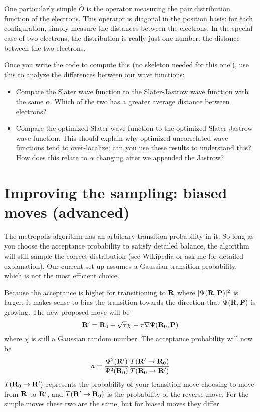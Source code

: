 \documentclass[12pt]{article}
\newcommand{\bR}{{\bf R}}
\newcommand{\bP}{{\bf P}}
\begin{document}
One particularly simple $\hat O$ is the operator measuring the pair distribution function of the electrons. 
This operator is diagonal in the position basis: for each configuration, simply measure the distances between the electrons.
In the special case of two electrons, the distribution is really just one number: the distance between the two electrons.

Once you write the code to compute this (no skeleton needed for this one!), use this to analyze the differences between our wave functions:
\begin{itemize}
  \item
    Compare the Slater wave function to the Slater-Jastrow wave function with the same $\alpha$. 
    Which of the two has a greater average distance between electrons?
  \item
    Compare the optimized Slater wave function to the optimized Slater-Jastrow wave function. 
    This should explain why optimized uncorrelated wave functions tend to over-localize; can you use these results to understand this? How does this relate to $\alpha$ changing after we appended the Jastrow?
\end{itemize}

\section{Improving the sampling: biased moves (advanced)} 

The metropolis algorithm has an arbitrary transition probability in it. 
So long as you choose the acceptance probability to satisfy detailed balance, the algorithm will still sample the correct distribution (see Wikipedia or ask me for detailed explanation).
Our current set-up assumes a Gaussian transition probability, which is not the most efficient choice.

Because the acceptance is higher for transitioning to $\bR$ where $|\Psi(\bR,\bP)|^2$ is larger, it makes sense to bias the transition towards the direction that $\Psi(\bR,\bP)$ is growing.
The new proposed move will be
\begin{equation}
  \bR'=\bR_0 + \sqrt{\tau} \chi + \tau \nabla \Psi(\bR_0,\bP)
\end{equation}
where $\chi$ is still a Gaussian random number.
The acceptance probability will now be 
\begin{equation}
  a=\frac{\Psi^2(\bR')}{\Psi^2(\bR_0)}
  \frac{T(\bR' \to \bR_0)}{T(\bR_0 \to \bR')}
\end{equation}
$T(\bR_0 \to \bR')$ represents the probability of your transition move choosing to move from $\bR$ to $\bR'$, and $T(\bR' \to \bR_0)$ is the probability of the reverse move.
For the simple moves these two are the same, but for biased moves they differ.
\end{document}
